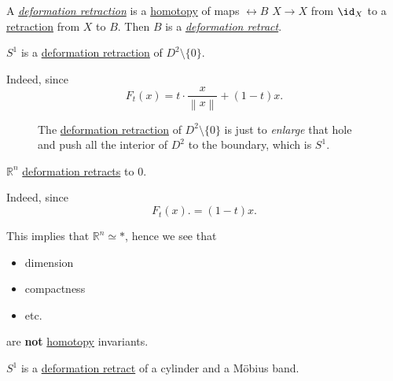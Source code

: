 \begin{prev}
	A \hyperref[def:deformation-retraction]{\emph{deformation retraction}} is a \hyperref[def:homotopy]{homotopy}
	of maps \(\rel B\) \(X\to X\) from \(\id_X\) to a \hyperref[def:retraction]{retraction} from \(X\) to \(B\). Then \(B\) is a
	\hyperref[def:deformation-retraction]{\emph{deformation retract}}.
\end{prev}

\begin{eg}
	\(S^1\) is a \hyperref[def:deformation-retraction]{deformation retraction} of \(D^{2}\setminus \{0\}\).
\end{eg}
\begin{explanation}
	Indeed, since
	\[
		F_t(x) = t\cdot \frac{x}{\left\lVert x\right\rVert } + (1 - t)x.
	\]
	\begin{figure}[H]
		\centering
		\caption{The \hyperref[def:deformation-retraction]{deformation retraction} of \(D^{2}\setminus \{0\}\) is just to
			\emph{enlarge} that hole and push all the interior of \(D^2\) to the boundary, which is \(S^1\).}
		\label{fig:eg:punched-circle}
	\end{figure}
\end{explanation}
\begin{eg}
	\(\mathbb{R} ^n\) \hyperref[def:deformation-retraction]{deformation retracts} to \(0\).
\end{eg}
\begin{explanation}
	Indeed, since
	\[
		F_t(x). = (1 - t)x.
	\]
	\begin{remark}
		This implies that \(\mathbb{R} ^n\simeq *\), hence we see that
		\begin{itemize}
			\item dimension
			\item compactness
			\item etc.
		\end{itemize}
		are \textbf{not} \hyperref[def:homotopy]{homotopy} invariants.
	\end{remark}
\end{explanation}
\begin{eg}
	\(S^1\) is a \hyperref[def:deformation-retraction]{deformation retract} of a cylinder and a Möbius band.
\end{eg}
